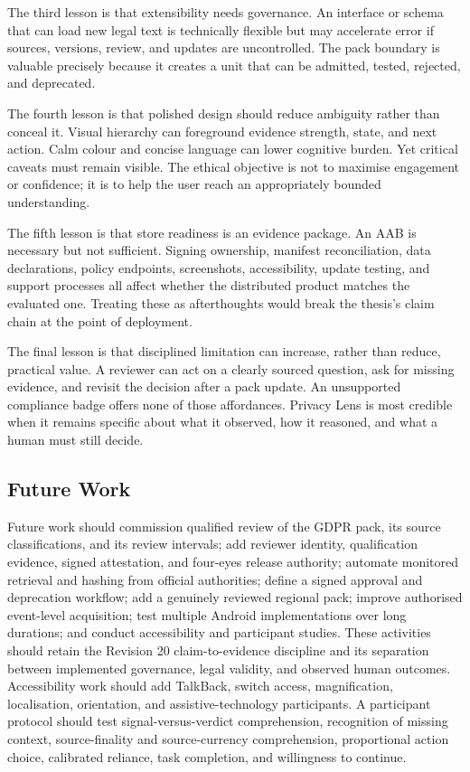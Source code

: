 The third lesson is that extensibility needs governance. An interface or schema that can load new legal text is technically flexible but may accelerate error if sources, versions, review, and updates are uncontrolled. The pack boundary is valuable precisely because it creates a unit that can be admitted, tested, rejected, and deprecated.

The fourth lesson is that polished design should reduce ambiguity rather than conceal it. Visual hierarchy can foreground evidence strength, state, and next action. Calm colour and concise language can lower cognitive burden. Yet critical caveats must remain visible. The ethical objective is not to maximise engagement or confidence; it is to help the user reach an appropriately bounded understanding.

The fifth lesson is that store readiness is an evidence package. An AAB is necessary but not sufficient. Signing ownership, manifest reconciliation, data declarations, policy endpoints, screenshots, accessibility, update testing, and support processes all affect whether the distributed product matches the evaluated one. Treating these as afterthoughts would break the thesis's claim chain at the point of deployment.

The final lesson is that disciplined limitation can increase, rather than reduce, practical value. A reviewer can act on a clearly sourced question, ask for missing evidence, and revisit the decision after a pack update. An unsupported compliance badge offers none of those affordances. Privacy Lens is most credible when it remains specific about what it observed, how it reasoned, and what a human must still decide.

\subsection{Future Work}

Future work should commission qualified review of the GDPR pack, its source classifications, and its review intervals; add reviewer identity, qualification evidence, signed attestation, and four-eyes release authority; automate monitored retrieval and hashing from official authorities; define a signed approval and deprecation workflow; add a genuinely reviewed regional pack; improve authorised event-level acquisition; test multiple Android implementations over long durations; and conduct accessibility and participant studies. These activities should retain the Revision 20 claim-to-evidence discipline and its separation between implemented governance, legal validity, and observed human outcomes. Accessibility work should add TalkBack, switch access, magnification, localisation, orientation, and assistive-technology participants. A participant protocol should test signal-versus-verdict comprehension, recognition of missing context, source-finality and source-currency comprehension, proportional action choice, calibrated reliance, task completion, and willingness to continue.

